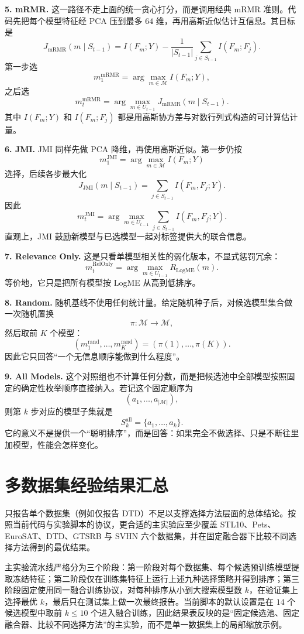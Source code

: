 \documentclass[UTF8,fontset=fandol]{ctexart}
\theoremstyle{remark}
\begin{document}
\textbf{5. mRMR.}
这一路径不走上面的统一贪心打分，而是调用经典 mRMR 准则。代码先把每个模型特征经 PCA 压到最多 $64$ 维，再用高斯近似估计互信息。其目标是
\[
J_{\mathrm{mRMR}}(m \mid S_{t-1})
= I(F_m;Y)
- \frac{1}{|S_{t-1}|}\sum_{j \in S_{t-1}} I(F_m;F_j).
\]
第一步选
\[
m_1^{\mathrm{mRMR}} = \arg\max_{m \in \mathcal M} I(F_m;Y),
\]
之后选
\[
m_t^{\mathrm{mRMR}}
= \arg\max_{m \in U_{t-1}}
J_{\mathrm{mRMR}}(m \mid S_{t-1}).
\]
其中 $I(F_m;Y)$ 和 $I(F_m;F_j)$ 都是用高斯协方差与对数行列式构造的可计算估计量。

\textbf{6. JMI.}
JMI 同样先做 PCA 降维，再使用高斯近似。第一步仍按
\[
m_1^{\mathrm{JMI}} = \arg\max_{m \in \mathcal M} I(F_m;Y)
\]
选择，后续各步最大化
\[
J_{\mathrm{JMI}}(m \mid S_{t-1})
= \sum_{j \in S_{t-1}} I(F_m, F_j; Y).
\]
因此
\[
m_t^{\mathrm{JMI}}
= \arg\max_{m \in U_{t-1}}
\sum_{j \in S_{t-1}} I(F_m, F_j; Y).
\]
直观上，JMI 鼓励新模型与已选模型一起对标签提供大的联合信息。

\textbf{7. Relevance Only.}
这是只看单模型相关性的弱化版本，不显式惩罚冗余：
\[
m_t^{\mathrm{RelOnly}}
= \arg\max_{m \in U_{t-1}} R_{\mathrm{LogME}}(m).
\]
等价地，它只是把所有模型按 LogME 从高到低排序。

\textbf{8. Random.}
随机基线不使用任何统计量。给定随机种子后，对候选模型集合做一次随机置换
\[
\pi : \mathcal M \to \mathcal M,
\]
然后取前 $K$ 个模型：
\[
(m_1^{\mathrm{rand}},\dots,m_K^{\mathrm{rand}})
= (\pi(1),\dots,\pi(K)).
\]
因此它只回答“一个无信息顺序能做到什么程度”。

\textbf{9. All Models.}
这个对照组也不计算任何分数，而是把候选池中全部模型按照固定的确定性枚举顺序直接纳入。若记这个固定顺序为
\[
(a_1,\dots,a_{|\mathcal M|}),
\]
则第 $k$ 步对应的模型子集就是
\[
S_k^{\mathrm{all}} = \{a_1,\dots,a_k\}.
\]
它的意义不是提供一个“聪明排序”，而是回答：如果完全不做选择、只是不断往里加模型，性能会怎样变化。

\section{多数据集经验结果汇总}

只报告单个数据集（例如仅报告 DTD）不足以支撑选择方法层面的总体结论。按照当前代码与实验脚本的协议，更合适的主实验应至少覆盖 STL10、Pets、EuroSAT、DTD、GTSRB 与 SVHN 六个数据集，并在固定融合器下比较不同选择方法得到的最优结果。

主实验流水线严格分为三个阶段：第一阶段对每个数据集、每个候选预训练模型提取冻结特征；第二阶段仅在训练集特征上运行上述九种选择策略并得到排序；第三阶段固定使用同一融合训练协议，对每种排序从小到大搜索模型数 $k$，在验证集上选择最优 $k$，最后只在测试集上做一次最终报告。当前脚本的默认设置是在 $14$ 个候选模型中取前 $k \le 10$ 个进入融合训练，因此结果表反映的是“固定候选池、固定融合器、比较不同选择方法”的主实验，而不是单一数据集上的局部缩放示例。
\end{document}
